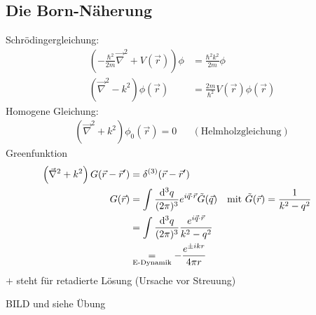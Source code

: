 \subsection{Die Born-Näherung}
	Schrödingergleichung:
		\begin{align*}
			\left(- \frac{\hbar^2}{2 m} \vec{\nabla}^2 + V (\vec{r})\right) \phi
			&= \frac{\hbar^2 k^2}{2m} \phi \\
			\left(\vec{\nabla}^2 - k^2\right) \phi(\vec{r}) 
			&= \frac{2m}{\hbar^2} V (\vec{r}) \phi (\vec{r})
		\end{align*}
	Homogene Gleichung:
		\begin{align*}
			\left(\vec{\nabla}^2 + k^2 \right) \phi_0 (\vec{r}) = 0 &
			&(\text{Helmholzgleichung}) 
		\end{align*}
	Greenfunktion
		\begin{align*}
			\left(\vec{\nabla}^2 + k^2 \right) G (\vec{r} - \vec{r}') 
			&= \delta^{(3)}(\vec{r} - \vec{r}') \\
			G(\vec{r}) &= 
			\int \frac{\mathrm{d}^3 q}{(2 \pi)^3} e^{i \vec{q} \cdot \vec{r}} \tilde{G}(\vec{q})
			&\text{mit } \tilde{G} (\vec{r}) &= \frac{1}{k^2-q^2} \\
			&= \int \frac{\mathrm{d}^3 q}{(2 \pi)^3} \frac{e^{i \vec{q} \cdot \vec{r}}}{k^2 - q^2} \\
			&\underset{\text{E-Dynamik}}{=} - \frac{e^{\pm i k r}}{4 \pi r}
		\end{align*}
	$+$ steht für retadierte Lösung (Ursache vor Streuung)
	
	BILD und siehe Übung
	
